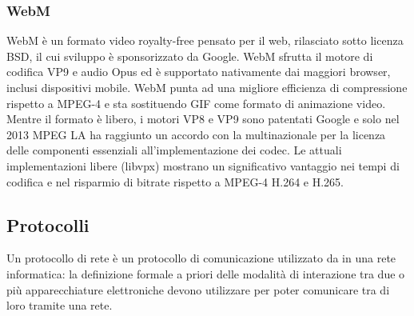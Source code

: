 		\subsubsection{WebM}
			WebM è un formato video royalty-free pensato per il web, rilasciato sotto licenza BSD, il cui sviluppo è sponsorizzato da Google. WebM sfrutta il motore di codifica VP9 e audio Opus ed è supportato nativamente dai maggiori browser, inclusi dispositivi mobile. WebM punta ad una migliore efficienza di compressione rispetto a MPEG-4 e sta sostituendo GIF come formato di animazione video. Mentre il formato è libero, i motori VP8 e VP9 sono patentati Google e solo nel 2013 MPEG LA ha raggiunto un accordo con la multinazionale per la licenza delle componenti essenziali all'implementazione dei codec. Le attuali implementazioni libere (libvpx) mostrano un significativo vantaggio nei tempi di codifica e nel risparmio di bitrate rispetto a MPEG-4 H.264 e H.265.
	\subsection{Protocolli}
	Un protocollo di rete è un protocollo di comunicazione utilizzato da in una rete informatica: la definizione formale a priori delle modalità di interazione tra due o più apparecchiature elettroniche devono utilizzare per poter comunicare tra di loro tramite una rete.

